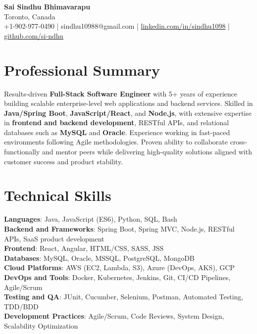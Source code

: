 \documentclass[letterpaper,11pt]{article}
\begin{document}
\begin{center}
  {\Large \textbf{Sai Sindhu Bhimavarapu}} \\
  Toronto, Canada \\
  +1-902-977-0490 \enspace | \enspace sindhu10988@gmail.com \enspace | \enspace \href{https://www.linkedin.com/in/sindhu1098/}{linkedin.com/in/sindhu1098} \enspace | \enspace \href{https://github.com/si-ndhu}{github.com/si-ndhu}
\end{center}

\section{Professional Summary}
  \begin{itemize}[leftmargin=0.15in, label={}]
    \small{\item{
     Results-driven \textbf{Full-Stack Software Engineer} with 5+ years of experience building scalable enterprise-level web applications and backend services. Skilled in \textbf{Java/Spring Boot}, \textbf{JavaScript/React}, and \textbf{Node.js}, with extensive expertise in \textbf{frontend and backend development}, RESTful APIs, and relational databases such as \textbf{MySQL} and \textbf{Oracle}. Experience working in fast-paced environments following Agile methodologies. Proven ability to collaborate cross-functionally and mentor peers while delivering high-quality solutions aligned with customer success and product stability.
    }}
  \end{itemize}
\vspace{-16pt}

\section{Technical Skills}
 \begin{itemize}[leftmargin=0.15in, label={}]
    \small{\item{
     \textbf{Languages}: Java, JavaScript (ES6), Python, SQL, Bash \\
     \textbf{Backend and Frameworks}: Spring Boot, Spring MVC, Node.js, RESTful APIs, SaaS product development \\
     \textbf{Frontend}: React, Angular, HTML/CSS, SASS, JSS \\
     \textbf{Databases}: MySQL, Oracle, MSSQL, PostgreSQL, MongoDB \\
     \textbf{Cloud Platforms}: AWS (EC2, Lambda, S3), Azure (DevOps, AKS), GCP \\
     \textbf{DevOps and Tools}: Docker, Kubernetes, Jenkins, Git, CI/CD Pipelines, Agile/Scrum \\
     \textbf{Testing and QA}: JUnit, Cucumber, Selenium, Postman, Automated Testing, TDD/BDD \\
     \textbf{Development Practices}: Agile/Scrum, Code Reviews, System Design, Scalability Optimization
    }}
 \end{itemize}
\vspace{-16pt}
\end{document}
